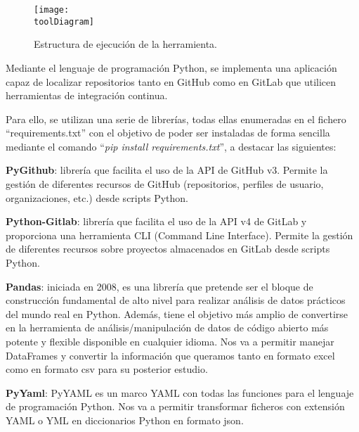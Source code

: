 \begin{figure}[h]
    \centering
    \texttt{[image: \\toolDiagram]}
    \caption{Estructura de ejecución de la herramienta.}
\end{figure}

Mediante el lenguaje de programación Python, se implementa una aplicación capaz de localizar repositorios tanto en GitHub como en GitLab que utilicen herramientas de integración continua.

Para ello, se utilizan una serie de librerías, todas ellas enumeradas en el fichero ``requirements.txt'' con el objetivo de poder ser instaladas de forma sencilla mediante el comando ``\textit{pip install requirements.txt}'', a destacar las siguientes:

\begin{compactitem}
    \item \textbf{PyGithub}: librería que facilita el uso de la API de GitHub v3. Permite la gestión de diferentes recursos de GitHub (repositorios, perfiles de usuario, organizaciones, etc.) desde scripts Python.
    \item \textbf{Python-Gitlab}: librería que facilita el uso de la API v4 de GitLab y proporciona una herramienta CLI (Command Line Interface). Permite la gestión de diferentes recursos sobre proyectos almacenados en GitLab desde scripts Python.
    \item \textbf{Pandas}: iniciada en 2008, es una librería que pretende ser el bloque de construcción fundamental de alto nivel para realizar análisis de datos prácticos del mundo real en Python. Además, tiene el objetivo más amplio de convertirse en la herramienta de análisis/manipulación de datos de código abierto más potente y flexible disponible en cualquier idioma. Nos va a permitir manejar DataFrames y convertir la información que queramos tanto en formato excel como en formato csv para su posterior estudio.
    \item \textbf{PyYaml}: PyYAML es un marco YAML con todas las funciones para el lenguaje de programación Python. Nos va a permitir transformar ficheros con extensión YAML o YML en diccionarios Python en formato json.
\end{compactitem}


